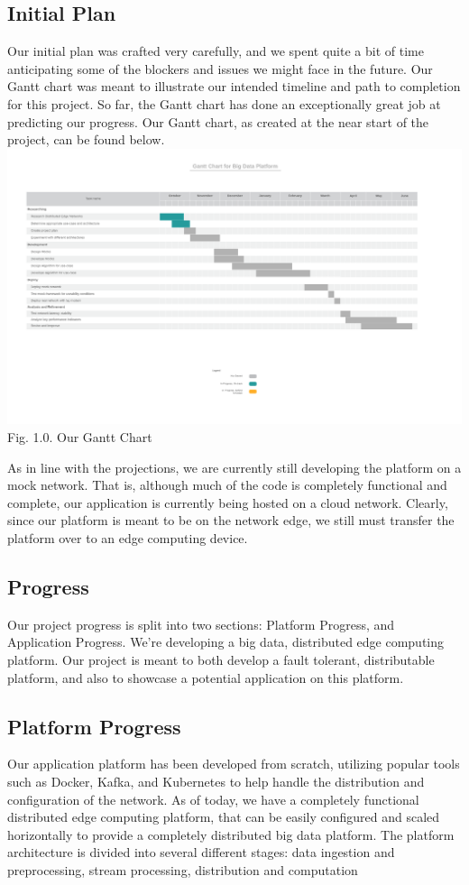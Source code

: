 \documentclass[10pt,journal,compsoc,onecolumn,draftclsnofoot]{IEEEtran}
\begin{document}
\subsection{Initial Plan}
Our initial plan was crafted very carefully, and we spent quite a bit of time anticipating some of the blockers and issues we might face in the future. Our Gantt chart was meant to illustrate our intended timeline and path to completion for this project. So far, the Gantt chart has done an exceptionally great job at predicting our progress. Our Gantt chart, as created at the near start of the project, can be found below.
    \includegraphics[width=1.10\textwidth]{Gantt.png}
    \hspace*{.5cm}\small{Fig. 1.0. Our Gantt Chart}

As in line with the projections, we are currently still developing the platform on a mock network. That is, although much of the code is completely functional and complete, our application is currently being hosted on a cloud network. Clearly, since our platform is meant to be on the network edge, we still must transfer the platform over to an edge computing device. 

\subsection{Progress} 
Our project progress is split into two sections: Platform Progress, and Application Progress. We're developing a big data, distributed edge computing platform. Our project is meant to both develop a fault tolerant, distributable platform, and also to showcase a potential application on this platform. 
\subsection{Platform Progress}
Our application platform has been developed from scratch, utilizing popular tools such as Docker, Kafka, and Kubernetes to help handle the distribution and configuration of the network. As of today, we have a completely functional distributed edge computing platform, that can be easily configured and scaled horizontally to provide a completely distributed big data platform. The platform architecture is divided into several different stages: data ingestion and preprocessing, stream processing, distribution and computation
\end{document}

